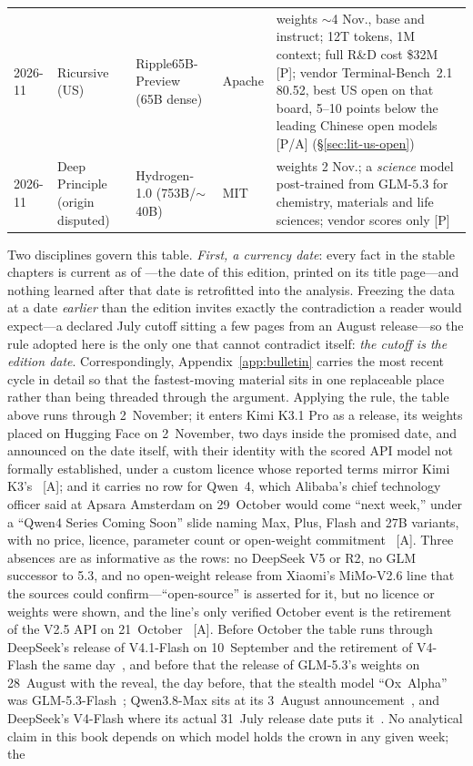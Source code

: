 {\begin{longtable}{p{15mm}p{17mm}p{28mm}p{14mm}p{58mm}}
    2026-11 & Ricursive (US) & Ripple65B-Preview (65B dense) & Apache & weights $\sim$4 Nov., base and instruct; 12T tokens, 1M context; full R\&D cost \$32M [P]; vendor Terminal-Bench~2.1 80.52, best US open on that board, 5--10 points below the leading Chinese open models [P/A] (\S\ref{sec:lit-us-open})~\cite{lit-ripple,lit-witteveen-ripple} \\
    2026-11 & Deep Principle (origin disputed) & Hydrogen-1.0 (753B/$\sim$40B) & MIT & weights 2 Nov.; a \emph{science} model post-trained from GLM-5.3 for chemistry, materials and life sciences; vendor scores only [P]~\cite{lit-hydrogen} \\
\end{longtable}
}


Two disciplines govern this table. \emph{First, a currency date}: every fact in the stable chapters is current as of \datafreeze---the date of this edition, printed on its title page---and nothing learned after that date is retrofitted into the analysis. Freezing the data at a date \emph{earlier} than the edition invites exactly the contradiction a reader would expect---a declared July cutoff sitting a few pages from an August release---so the rule adopted here is the only one that cannot contradict itself: \emph{the cutoff is the edition date}. Correspondingly, Appendix~\ref{app:bulletin} carries the most recent cycle in detail so that the fastest-moving material sits in one replaceable place rather than being threaded through the argument. Applying the rule, the table above runs through 2~November; it enters Kimi K3.1 Pro as a release, its weights placed on Hugging Face on 2~November, two days inside the promised date, and announced on the date itself, with their identity with the scored API model not formally established, under a custom licence whose reported terms mirror Kimi K3's~\cite{mdl-kimi-k31,lit-k31-weights} [A]; and it carries no row for Qwen~4, which Alibaba's chief technology officer said at Apsara Amsterdam on 29~October would come ``next week,'' under a ``Qwen4 Series Coming Soon'' slide naming Max, Plus, Flash and 27B variants, with no price, licence, parameter count or open-weight commitment~\cite{mdl-qwen4-tease} [A]. Three absences are as informative as the rows: no DeepSeek V5 or R2, no GLM successor to 5.3, and no open-weight release from Xiaomi's MiMo-V2.6 line that the sources could confirm---``open-source'' is asserted for it, but no licence or weights were shown, and the line's only verified October event is the retirement of the V2.5 API on 21~October~\cite{mdl-mimo-v26} [A]. Before October the table runs through DeepSeek's release of V4.1-Flash on 10~September and the retirement of V4-Flash the same day~\cite{deepseek-v41flash,deepseek-v41flash-updates}, and before that the release of GLM-5.3's weights on 28~August with the reveal, the day before, that the stealth model ``Ox~Alpha'' was GLM-5.3-Flash~\cite{glm53,glm53-flash}; Qwen3.8-Max sits at its 3~August announcement~\cite{qwen-announcement,qwen38-max}, and DeepSeek's V4-Flash where its actual 31~July release date puts it~\cite{v4flash}. No analytical claim in this book depends on which model holds the crown in any given week; the 